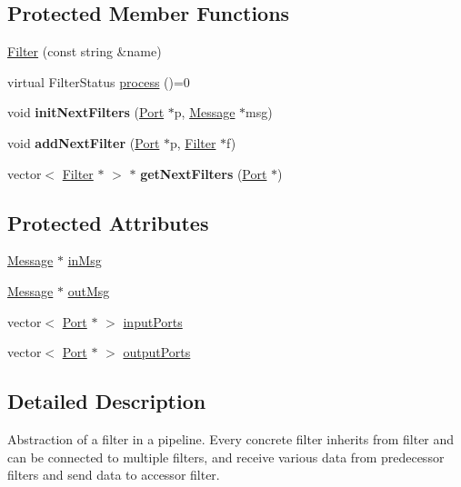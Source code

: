 \subsection*{Protected Member Functions}
\begin{DoxyCompactItemize}
\item 
\hyperlink{classFilter_a7ae8f58626026a84e7eabde716776ec1}{Filter} (const string \&name)
\item 
virtual Filter\-Status \hyperlink{classFilter_afc96de71a53a15012de467491cf4e295}{process} ()=0
\item 
\hypertarget{classFilter_a8bd672f5b5632a7ec832d5e53fb9df7b}{void {\bfseries init\-Next\-Filters} (\hyperlink{classPort}{Port} $\ast$p, \hyperlink{classMessage}{Message} $\ast$msg)}\label{classFilter_a8bd672f5b5632a7ec832d5e53fb9df7b}

\item 
\hypertarget{classFilter_a408bb81b8b89ec1f29406099885bca21}{void {\bfseries add\-Next\-Filter} (\hyperlink{classPort}{Port} $\ast$p, \hyperlink{classFilter}{Filter} $\ast$f)}\label{classFilter_a408bb81b8b89ec1f29406099885bca21}

\item 
\hypertarget{classFilter_a754fdff6368404b07e32b802b1a1b80c}{vector$<$ \hyperlink{classFilter}{Filter} $\ast$ $>$ $\ast$ {\bfseries get\-Next\-Filters} (\hyperlink{classPort}{Port} $\ast$)}\label{classFilter_a754fdff6368404b07e32b802b1a1b80c}

\end{DoxyCompactItemize}
\subsection*{Protected Attributes}
\begin{DoxyCompactItemize}
\item 
\hyperlink{classMessage}{Message} $\ast$ \hyperlink{classFilter_ac938e02933af2dfb267895d260221d92}{in\-Msg}
\item 
\hyperlink{classMessage}{Message} $\ast$ \hyperlink{classFilter_a5c1d2a7a7da437769281029505ef3054}{out\-Msg}
\item 
vector$<$ \hyperlink{classPort}{Port} $\ast$ $>$ \hyperlink{classFilter_ad09f0773f4b96d6f9ac143bb5b046d0b}{input\-Ports}
\item 
vector$<$ \hyperlink{classPort}{Port} $\ast$ $>$ \hyperlink{classFilter_abf9b24a29561046ca09c65f5dde427ea}{output\-Ports}
\end{DoxyCompactItemize}


\subsection{Detailed Description}
Abstraction of a filter in a pipeline. Every concrete filter inherits from filter and can be connected to multiple filters, and receive various data from predecessor filters and send data to accessor filter. 

